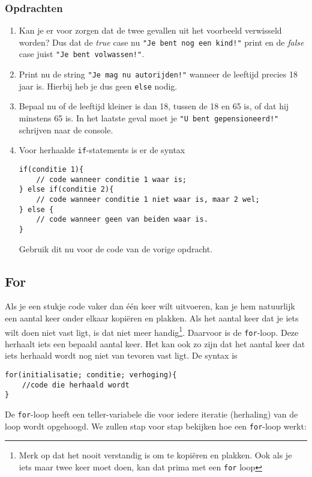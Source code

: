 \documentclass[12pt,a4paper]{article}
\newcommand{\icode}{\lstinline}
\begin{document}
\subsubsection{Opdrachten}
\begin{enumerate}
		\item
		Kan je er voor zorgen dat de twee gevallen uit het voorbeeld verwisseld worden? Dus dat de \emph{true} case nu \icode{"Je bent nog een kind!"} print en de \emph{false} case juist \icode{"Je bent volwassen!"}.
		\item
			Print nu de string \icode{"Je mag nu autorijden!"} wanneer de leeftijd precies 18 jaar is. Hierbij heb je dus geen \icode{else} nodig.
		\item
			Bepaal nu of de leeftijd kleiner is dan 18, tussen de 18 en 65 is, of dat hij minstens 65 is. In het laatste geval moet je \icode{"U bent gepensioneerd!"} schrijven naar de console.
		\item
			Voor herhaalde \icode{if}-statements is er de syntax
\begin{lstlisting}
if(conditie 1){
	// code wanneer conditie 1 waar is;
} else if(conditie 2){
	// code wanneer conditie 1 niet waar is, maar 2 wel;
} else {
	// code wanneer geen van beiden waar is.
}
\end{lstlisting}
Gebruik dit nu voor de code van de vorige opdracht.
\end{enumerate}


\subsection{For}
Als je een stukje code vaker dan \'e\'en keer wilt uitvoeren, kan je hem natuurlijk een aantal keer onder elkaar kopi\"eren en plakken. Als het aantal keer dat je iets wilt doen niet vast ligt, is dat niet meer handig\footnote{Merk op dat het nooit verstandig is om te kopi\"eren en plakken. Ook als je iets maar twee keer moet doen, kan dat prima met een \icode{for} loop}. Daarvoor is de \icode{for}-loop.
Deze herhaalt iets een bepaald aantal keer. Het kan ook zo zijn dat het aantal keer dat iets herhaald wordt nog niet van tevoren vast ligt. De syntax is 
\begin{lstlisting}
for(initialisatie; conditie; verhoging){
	//code die herhaald wordt
}
\end{lstlisting}
De \icode{for}-loop heeft een teller-variabele die voor iedere iteratie (herhaling) van de loop wordt opgehoogd. We zullen stap voor stap bekijken hoe een \icode{for}-loop werkt:
\end{document}
